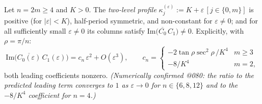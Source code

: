 \begin{lemma}
  \label{lem:anchor_witness_two_level}
  Let $n = 2m \ge 4$ and $K > 0$. The \emph{two-level profile}
  $\kappa^{(\varepsilon)}_j := K + \varepsilon\,[j \in \{0, m\}]$ is positive
  (for $|\varepsilon| < K$), half-period symmetric, and non-constant for
  $\varepsilon \ne 0$; and for all sufficiently small $\varepsilon \ne 0$ its
  columns satisfy
  $\mathrm{Im}\bigl(\overline{C_0}\,C_1\bigr) \ne 0$. Explicitly, with
  $\rho = \pi/n$:
  \[
    \mathrm{Im}\bigl(\overline{C_0(\varepsilon)}\,C_1(\varepsilon)\bigr)
    = c_n\,\varepsilon^2 + O(\varepsilon^3), \qquad
    c_n = \begin{cases}
      -2\tan\rho\sec^2\rho\,/K^4 & m \ge 3\\[2pt]
      -8/K^4 & m = 2,
    \end{cases}
  \]
  both leading coefficients nonzero. \emph{(Numerically confirmed @080: the
  ratio to the predicted leading term converges to $1$ as $\varepsilon \to 0$
  for $n \in \{6,8,12\}$ and to the $-8/K^4$ coefficient for $n=4$.)}
\end{lemma}
